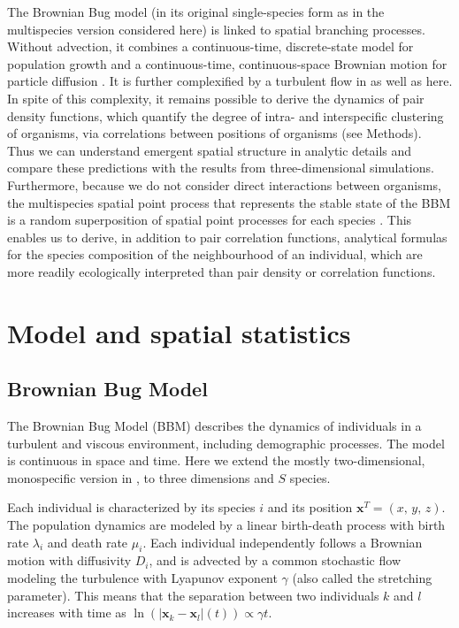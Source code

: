 \documentclass[english]{article}
\newcommand{\bx}{\boldsymbol{x}}
\begin{document}
The Brownian Bug model (in its original single-species form as in
the multispecies version considered here) is linked to spatial branching
processes. Without advection, it combines a continuous-time, discrete-state
model for population growth and a continuous-time, continuous-space
Brownian motion for particle diffusion \citep{birch_master_2006}.
It is further complexified by a turbulent flow in \citet{young_reproductive_2001,picoche_rescience_2022}
as well as here. In spite of this complexity, it remains possible
to derive the dynamics of pair density functions, which quantify the
degree of intra- and interspecific clustering of organisms, via correlations
between positions of organisms (see Methods). Thus we can understand
emergent spatial structure in analytic details and compare these predictions
with the results from three-dimensional simulations. Furthermore,
because we do not consider direct interactions between organisms,
the multispecies spatial point process that represents the stable
state of the BBM is a random superposition of spatial point processes
for each species \citep{illian2008statistical}. This enables us to
derive, in addition to pair correlation functions, analytical formulas
for the species composition of the neighbourhood of an individual,
which are more readily ecologically interpreted than pair density
or correlation functions. 


\section*{Model and spatial statistics}

\subsection*{Brownian Bug Model}

The Brownian Bug Model (BBM) describes the dynamics of individuals
in a turbulent and viscous environment, including demographic processes.
The model is continuous in space and time. Here we extend the mostly
two-dimensional, monospecific version in \citet{young_reproductive_2001},
to three dimensions and $S$ species.

Each individual is characterized by its species $i$ and its position
$\mathbf{x}^{T}=(x,\,y,\,z)$. The population dynamics are modeled
by a linear birth-death process with birth rate $\lambda_{i}$ and
death rate $\mu_{i}$. Each individual independently follows a Brownian
motion with diffusivity $D_{i}$, and is advected by a common stochastic
flow modeling the turbulence with Lyapunov exponent $\gamma$ (also
called the stretching parameter). This means that the separation between
two individuals $k$ and $l$ increases with time as $\ln\left(|\bx_{k}-\bx_{l}|(t)\right)\propto \gamma t$.
\end{document}
